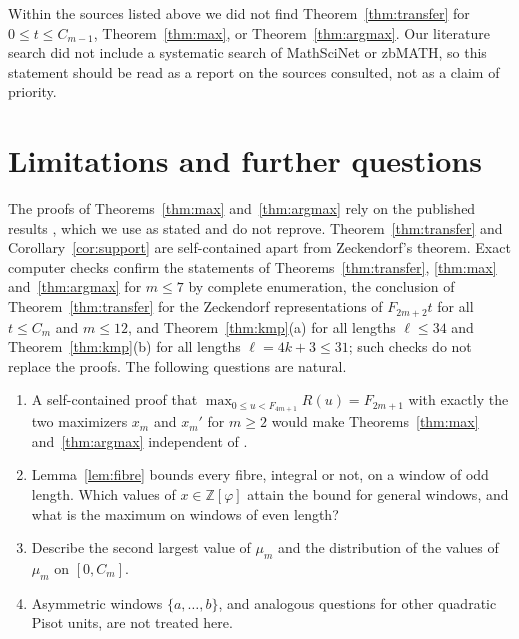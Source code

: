 \documentclass[11pt]{amsart}
\theoremstyle{definition}
\theoremstyle{remark}
\numberwithin{equation}{section}
\newcommand{\Z}{\mathbb{Z}}
\begin{document}
Within the sources listed above we did not find Theorem~\ref{thm:transfer} for
$0\le t\le C_{m-1}$, Theorem~\ref{thm:max}, or Theorem~\ref{thm:argmax}. Our literature search did not
include a systematic search of MathSciNet or zbMATH, so this statement should be read as a report on
the sources consulted, not as a claim of priority.

\section{Limitations and further questions}\label{sec:limits}

The proofs of Theorems~\ref{thm:max} and~\ref{thm:argmax} rely on the published results
\cite[Theorem~4.7, Lemma~3.1, Corollary~5.1(i)]{KMP2005}, which we use as stated and do not reprove.
Theorem~\ref{thm:transfer} and Corollary~\ref{cor:support} are self-contained apart from Zeckendorf's
theorem. Exact computer checks confirm the statements of Theorems~\ref{thm:transfer},
\ref{thm:max} and~\ref{thm:argmax} for $m\le7$ by complete enumeration, the conclusion of
Theorem~\ref{thm:transfer} for the Zeckendorf representations of $F_{2m+2}t$ for all $t\le C_m$ and
$m\le12$, and Theorem~\ref{thm:kmp}(a) for all lengths $\ell\le34$ and Theorem~\ref{thm:kmp}(b) for
all lengths $\ell=4k+3\le31$; such checks do not replace the proofs. The following questions are natural.
\begin{enumerate}
\item A self-contained proof that $\max_{0\le u<F_{4m+1}}R(u)=F_{2m+1}$ with exactly the two
maximizers $x_m$ and $x_m'$ for $m\ge2$ would make Theorems~\ref{thm:max} and~\ref{thm:argmax}
independent of \cite{KMP2005}.
\item Lemma~\ref{lem:fibre} bounds every fibre, integral or not, on a window of odd length. Which
values of $x\in\Z[\varphi]$ attain the bound for general windows, and what is the maximum on windows of
even length?
\item Describe the second largest value of $\mu_m$ and the distribution of the values of $\mu_m$ on
$[0,C_m]$.
\item Asymmetric windows $\{a,\dots,b\}$, and analogous questions for other quadratic Pisot units,
are not treated here.
\end{enumerate}
\end{document}

